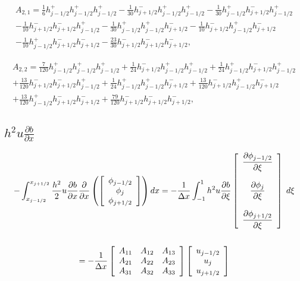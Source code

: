 \documentclass[12pt]{article}
\begin{document}
\begin{multline*} A_{2,1} = \frac{1}{6} h_{j-1/2}^+ h_{j-1/2}^+ h_{j-1/2}^+-\frac{1}{30} h_{j+1/2}^- h_{j-1/2}^+ h_{j-1/2}^+-\frac{1}{30} h_{j-1/2}^+ h_{j+1/2}^- h_{j-1/2}^+\\-\frac{1}{10} h_{j+1/2}^- h_{j+1/2}^- h_{j-1/2}^+-\frac{1}{30} h_{j-1/2}^+ h_{j-1/2}^+ h_{j+1/2}^--\frac{1}{10} h_{j+1/2}^- h_{j-1/2}^+ h_{j+1/2}^-\\-\frac{1}{10} h_{j-1/2}^+ h_{j+1/2}^- h_{j+1/2}^--\frac{23}{30} h_{j+1/2}^- h_{j+1/2}^- h_{j+1/2}^-, \end{multline*}

\begin{multline*} A_{2,2} = \frac{7}{120} h_{j-1/2}^+ h_{j-1/2}^+ h_{j-1/2}^++\frac{1}{24} h_{j+1/2}^- h_{j-1/2}^+ h_{j-1/2}^++\frac{1}{24} h_{j-1/2}^+ h_{j+1/2}^- h_{j-1/2}^+\\+\frac{13}{120} h_{j+1/2}^- h_{j+1/2}^- h_{j-1/2}^++\frac{1}{24} h_{j-1/2}^+ h_{j-1/2}^+ h_{j+1/2}^-+\frac{13}{120} h_{j+1/2}^- h_{j-1/2}^+ h_{j+1/2}^-\\+\frac{13}{120} h_{j-1/2}^+ h_{j+1/2}^- h_{j+1/2}^-+\frac{79}{120} h_{j+1/2}^- h_{j+1/2}^- h_{j+1/2}^-, \end{multline*}



\subsection{$h^2 u \frac{\partial b}{\partial x}$}

\begin{multline*}
-\int_{x_{j-1/2}}^{x_{j+1/2}}\frac{h^2}{2}  u \frac{\partial b}{\partial x} \frac{\partial}{\partial x} \left(\left[\begin{array}{c}\phi_{j-1/2} \\\phi_{j}\\\phi_{j+1/2} \end{array}\right] \right) dx = -\frac{1}{\Delta x} \int_{-1}^{1}h^2 u \frac{\partial b}{\partial \xi}  \left[\begin{array}{c} \dfrac{\partial \phi_{j-1/2} }{\partial \xi}\\ \\ \dfrac{\partial \phi_{j} }{\partial \xi}\\ \\\dfrac{\partial \phi_{j+1/2} }{\partial \xi} \end{array}\right] \; d\xi \\ \\ =
-\frac{1}{\Delta x} \left[\begin{array}{c c c } 
A_{11} & A_{12}  & A_{13}\\
A_{21} & A_{22}  & A_{23}\\
A_{31} & A_{32}  & A_{33}\\
\end{array}\right] \left[\begin{array}{c}u_{j-1/2} \\u_{j}\\u_{j+1/2} \end{array}\right]
\end{multline*}
\end{document}
